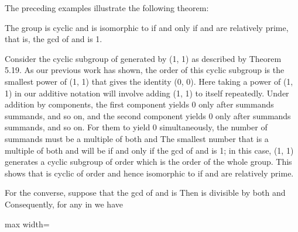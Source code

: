 \documentclass[11pt,oneside]{article}
\begin{document}
\begin{BookBody}

The preceding examples illustrate the following theorem:

 The group  is cyclic and is isomorphic to  if and only if  and  are relatively prime, that is, the gcd of  and  is 1.

 Consider the cyclic subgroup of  generated by (1, 1) as described by Theorem 5.19. As our previous work has shown, the order of this cyclic subgroup is the smallest power of (1, 1) that gives the identity (0, 0). Here taking a power of (1, 1) in our additive notation will involve adding (1, 1) to itself repeatedly. Under addition by components, the first component  yields 0 only after  summands summands, and so on, and the second component  yields 0 only after  summands summands, and so on. For them to yield 0 simultaneously, the number of summands must be a multiple of both  and  The smallest number that is a multiple of both  and  will be  if and only if the gcd of  and  is 1; in this case, (1, 1) generates a cyclic subgroup of order  which is the order of the whole group. This shows that  is cyclic of order  and hence isomorphic to  if  and  are relatively prime.

For the converse, suppose that the gcd of  and  is  Then  is divisible by both  and  Consequently, for any  in  we have

\begin{center}\begin{adjustbox}{max width=\linewidth}\end{adjustbox}\end{center}


\end{BookBody}
\end{document}
